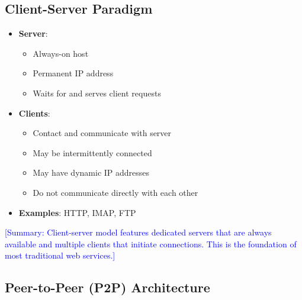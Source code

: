 \documentclass[12pt]{article}
\begin{document}
\subsection{Client-Server Paradigm}


\begin{itemize}
    \item \textbf{Server}:
          \begin{itemize}
              \item Always-on host
              \item Permanent IP address
              \item Waits for and serves client requests
          \end{itemize}
    \item \textbf{Clients}:
          \begin{itemize}
              \item Contact and communicate with server
              \item May be intermittently connected
              \item May have dynamic IP addresses
              \item Do not communicate directly with each other
          \end{itemize}
    \item \textbf{Examples}: HTTP, IMAP, FTP
\end{itemize}

\textcolor{blue}{[Summary: Client-server model features dedicated servers that are always available and multiple clients that initiate connections. This is the foundation of most traditional web services.]}

\subsection{Peer-to-Peer (P2P) Architecture}
\end{document}
